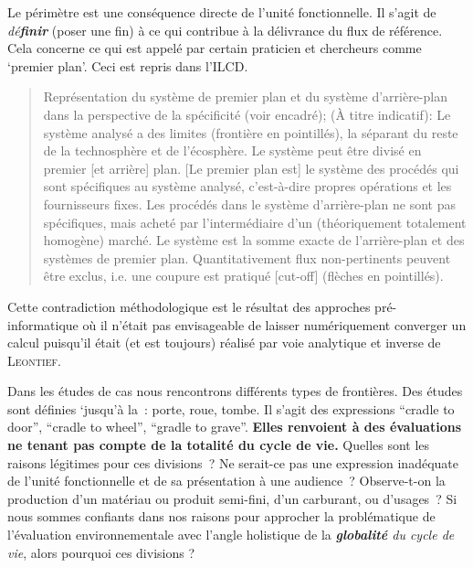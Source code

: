 Le périmètre est une conséquence directe de l'unité fonctionnelle.
Il s'agit de \textit{dé\textbf{finir}} (poser une fin) à ce qui contribue à la délivrance du flux de référence.
Cela concerne ce qui est appelé par certain praticien et chercheurs comme `premier plan'.
Ceci est repris dans l'ILCD.
\blockcquote[Figure 13, p., traduction]{europ}{
Représentation du système de premier plan et du système d'arrière-plan dans la perspective de la spécificité (voir encadré);
(À titre indicatif): Le système analysé a des limites (frontière en pointillés), la séparant du reste de la technosphère et de l'écosphère.
Le système peut être divisé en premier [et arrière] plan.
[Le premier plan est] le système des procédés qui sont spécifiques au système analysé, c'est-à-dire propres opérations et les fournisseurs fixes.
Les procédés dans le système d'arrière-plan ne sont pas spécifiques, mais acheté par l'intermédiaire d'un (théoriquement totalement homogène) marché.
Le système est la somme exacte de l'arrière-plan et des systèmes de premier plan.
Quantitativement flux non-pertinents peuvent être exclus, i.e. une coupure est pratiqué [cut-off] (flèches en pointillés).}
Cette contradiction méthodologique est le résultat des approches pré-informatique où il n'était pas envisageable de laisser numériquement converger un calcul puisqu'il était (et est toujours) réalisé par voie analytique et inverse de \textsc{Leontief}.

Dans les études de cas nous rencontrons différents types de frontières.
Des études sont définies `jusqu'à la~: porte, roue, tombe.
Il s'agit des expressions ``cradle to door'', ``cradle to wheel'', ``gradle to grave''.
\textbf{Elles renvoient à des évaluations ne tenant pas compte de la totalité du cycle de vie.}
Quelles sont les raisons légitimes pour ces divisions~?
Ne serait-ce pas une expression inadéquate de l'unité fonctionnelle et de sa présentation à une audience~?
Observe-t-on la production d'un matériau ou produit semi-fini, d'un carburant, ou d'usages~?
Si nous sommes confiants dans nos raisons pour approcher la problématique de l'évaluation environnementale avec l'angle holistique de la \emph{\textbf{globalité} du cycle de vie}, alors pourquoi ces divisions ?

